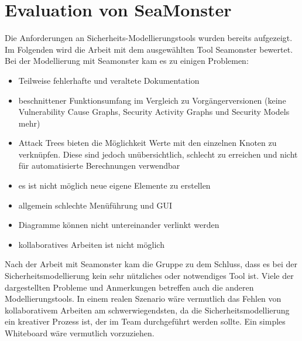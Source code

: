 \section{Evaluation von SeaMonster}
Die Anforderungen an Sicherheits-Modellierungstools wurden bereits aufgezeigt. Im Folgenden wird die Arbeit mit dem ausgewählten Tool Seamonster bewertet. Bei der Modellierung mit Seamonster kam es zu einigen Problemen:
\begin{itemize}
\item Teilweise fehlerhafte und veraltete Dokumentation
\item beschnittener Funktionsumfang im Vergleich zu Vorgängerversionen (keine Vulnerability Cause Graphs, Security Activity Graphs und Security Models mehr)
\item Attack Trees bieten die Möglichkeit Werte mit den einzelnen Knoten zu verknüpfen. Diese sind jedoch unübersichtlich, schlecht zu erreichen und nicht für automatisierte Berechnungen verwendbar
\item es ist nicht möglich neue eigene Elemente zu erstellen
\item allgemein schlechte Menüführung und GUI
\item Diagramme können nicht untereinander verlinkt werden
\item kollaboratives Arbeiten ist nicht möglich
\end{itemize}

Nach der Arbeit mit Seamonster kam die Gruppe zu dem Schluss, dass es bei der Sicherheitsmodellierung kein sehr nützliches oder notwendiges Tool ist. Viele der dargestellten Probleme und Anmerkungen betreffen auch die anderen Modellierungstools. In einem realen Szenario wäre vermutlich das Fehlen von kollaborativem Arbeiten am schwerwiegendsten, da die Sicherheitsmodellierung ein kreativer Prozess ist, der im Team durchgeführt werden sollte. Ein simples Whiteboard wäre vermutlich vorzuziehen.